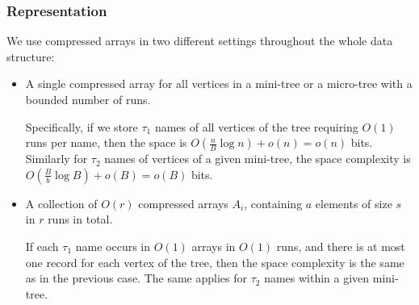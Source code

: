 \subsubsection{Representation}

We use compressed arrays in two different settings throughout the whole data structure:
\begin{itemize}
	\item A single compressed array for all vertices in a mini-tree or a micro-tree with a bounded number of runs.
	
	Specifically, if we store $\tau_1$ names of all vertices of the tree requiring $O(1)$ runs per name, then the space is $O(\frac{n}{B} \log n) + o(n) = o(n)$ bits.
	Similarly for $\tau_2$ names of vertices of a given mini-tree, the space complexity is $O(\frac{B}{b} \log B) + o(B) = o(B)$ bits.
	
	\item A collection of $O(r)$ compressed arrays $A_i$, containing $a$ elements of size $s$ in $r$ runs in total.
	
	If each $\tau_1$ name occurs in $O(1)$ arrays in $O(1)$ runs, and there is at most one record for each vertex of the tree, then the space complexity is the same as in the previous case.
	The same applies for $\tau_2$ names within a given mini-tree.
\end{itemize}

